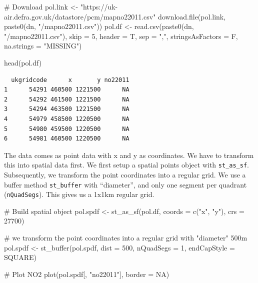 \documentclass[
  letterpaper,
  DIV=11,
  numbers=noendperiod]{scrreprt}
\newenvironment{Shaded}{\begin{snugshade}}{\end{snugshade}}
\newcommand{\AttributeTok}[1]{\textcolor[rgb]{0.40,0.45,0.13}{#1}}
\newcommand{\CommentTok}[1]{\textcolor[rgb]{0.37,0.37,0.37}{#1}}
\newcommand{\ConstantTok}[1]{\textcolor[rgb]{0.56,0.35,0.01}{#1}}
\newcommand{\DecValTok}[1]{\textcolor[rgb]{0.68,0.00,0.00}{#1}}
\newcommand{\FunctionTok}[1]{\textcolor[rgb]{0.28,0.35,0.67}{#1}}
\newcommand{\NormalTok}[1]{\textcolor[rgb]{0.00,0.23,0.31}{#1}}
\newcommand{\OtherTok}[1]{\textcolor[rgb]{0.00,0.23,0.31}{#1}}
\newcommand{\StringTok}[1]{\textcolor[rgb]{0.13,0.47,0.30}{#1}}
\begin{document}
\begin{Shaded}
\begin{Highlighting}[]
\CommentTok{\# Download}
\NormalTok{pol.link }\OtherTok{\textless{}{-}} \StringTok{"https://uk{-}air.defra.gov.uk/datastore/pcm/mapno22011.csv"}
\FunctionTok{download.file}\NormalTok{(pol.link, }\FunctionTok{paste0}\NormalTok{(dn, }\StringTok{"/mapno22011.csv"}\NormalTok{))}
\NormalTok{pol.df }\OtherTok{\textless{}{-}} \FunctionTok{read.csv}\NormalTok{(}\FunctionTok{paste0}\NormalTok{(dn, }\StringTok{"/mapno22011.csv"}\NormalTok{), }\AttributeTok{skip =} \DecValTok{5}\NormalTok{, }\AttributeTok{header =}\NormalTok{ T, }\AttributeTok{sep =} \StringTok{","}\NormalTok{,}
                      \AttributeTok{stringsAsFactors =}\NormalTok{ F, }\AttributeTok{na.strings =} \StringTok{"MISSING"}\NormalTok{)}

\FunctionTok{head}\NormalTok{(pol.df)}
\end{Highlighting}
\end{Shaded}

\begin{verbatim}
  ukgridcode      x       y no22011
1      54291 460500 1221500      NA
2      54292 461500 1221500      NA
3      54294 463500 1221500      NA
4      54979 458500 1220500      NA
5      54980 459500 1220500      NA
6      54981 460500 1220500      NA
\end{verbatim}

The data comes as point data with x and y as coordinates. We have to
transform this into spatial data first. We first setup a spatial points
object with \texttt{st\_as\_sf}. Subsequently, we transform the point
coordinates into a regular grid. We use a buffer method
\texttt{st\_buffer} with ``diameter'', and only one segment per quadrant
(\texttt{nQuadSegs}). This gives us a 1x1km regular grid.

\begin{Shaded}
\begin{Highlighting}[]
\CommentTok{\# Build spatial object}
\NormalTok{pol.spdf }\OtherTok{\textless{}{-}} \FunctionTok{st\_as\_sf}\NormalTok{(pol.df, }\AttributeTok{coords =} \FunctionTok{c}\NormalTok{(}\StringTok{"x"}\NormalTok{, }\StringTok{"y"}\NormalTok{),}
                    \AttributeTok{crs =} \DecValTok{27700}\NormalTok{)}

\CommentTok{\# we transform the point coordinates into a regular grid with "diameter" 500m}
\NormalTok{pol.spdf }\OtherTok{\textless{}{-}} \FunctionTok{st\_buffer}\NormalTok{(pol.spdf, }\AttributeTok{dist =} \DecValTok{500}\NormalTok{, }\AttributeTok{nQuadSegs  =} \DecValTok{1}\NormalTok{,}
                      \AttributeTok{endCapStyle =} \StringTok{\textquotesingle{}SQUARE\textquotesingle{}}\NormalTok{)}

\CommentTok{\# Plot NO2}
\FunctionTok{plot}\NormalTok{(pol.spdf[, }\StringTok{"no22011"}\NormalTok{], }\AttributeTok{border =} \ConstantTok{NA}\NormalTok{)}
\end{Highlighting}
\end{Shaded}
\end{document}
